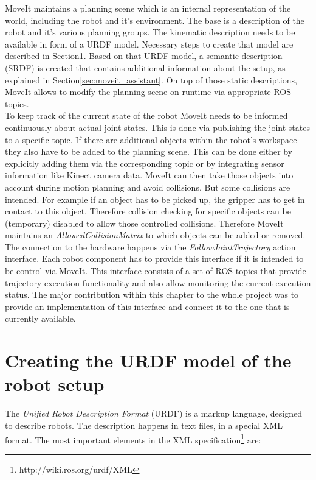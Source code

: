 MoveIt maintains a planning scene which is an internal representation of the world, including the robot and it's environment. The base is a description of the robot and it's various planning groups. 
The kinematic description needs to be available in form of a URDF model. Necessary steps to create that model are described in Section\ref{sec:urdf}. Based on that URDF model, a semantic description (SRDF) is created that contains additional information about the setup, as explained in Section\ref{sec:moveit_assistant}. On top of those static descriptions, MoveIt allows to modify the planning scene on runtime via appropriate ROS topics.\\

To keep track of the current state of the robot MoveIt needs to be informed continuously about actual joint states. This is done via publishing the joint states to a specific topic. If there are additional objects within the robot's workspace they also have to be added to the planning scene. This can be done either by explicitly adding them via the corresponding topic or by integrating sensor information like Kinect camera data. MoveIt can then take those objects into account during motion planning and avoid collisions. But some collisions are intended. For example if an object has to be picked up, the gripper has to get in contact to this object. Therefore collision checking for specific objects can be (temporary) disabled to allow those controlled collisions. Therefore MoveIt maintains an \emph{AllowedCollisionMatrix} to which objects can be added or removed. The connection to the hardware happens via the \emph{FollowJointTrajectory} action interface. Each robot component has to provide this interface if it is intended to be control via MoveIt. This interface consists of a set of ROS topics that provide trajectory execution functionality and also allow monitoring the current execution status. The major contribution within this chapter to the whole project was to provide an implementation of this interface and connect it to the one that is currently available.

\section{Creating the URDF model of the robot setup}
\label{sec:urdf}

The \emph{Unified Robot Description Format} (URDF) is a markup language, designed to describe robots. The description happens in text files, in a special XML format. The most important elements in the XML specification\footnote{http://wiki.ros.org/urdf/XML} are:

